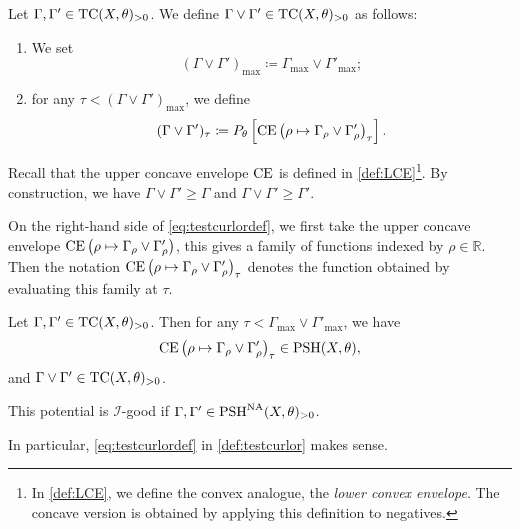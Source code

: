 \begin{definition}\label{def:testcurlor}
    Let $\Gamma,\Gamma'\in \mathrm{TC}(X,\theta)_{>0}$. We define $\Gamma\lor \Gamma'\in \mathrm{TC}(X,\theta)_{>0}$ as follows:
    \begin{enumerate}
        \item\label{itm:def:testcurlor:1} We set
        \[
            (\Gamma\lor \Gamma')_{\max}\coloneqq \Gamma_{\max}\lor \Gamma'_{\max};
        \]
        \item\label{itm:def:testcurlor:2} for any $\tau<(\Gamma\lor \Gamma')_{\max}$, we define
        \begin{equation}\label{eq:testcurlordef}
            (\Gamma\lor \Gamma')_{\tau}\coloneqq P_{\theta}\left[ \operatorname{CE}\left( \rho \mapsto \Gamma_{\rho}\lor \Gamma'_{\rho} \right)_{\tau} \right].
        \end{equation}
    \end{enumerate}
\end{definition}
Recall that the upper concave envelope $\operatorname{CE}$ is defined in \cref{def:LCE}\footnote{In \cref{def:LCE}, we define the convex analogue, the \emph{lower convex envelope}. The concave version is obtained by applying this definition to negatives.}. By construction, we have $\Gamma\lor \Gamma'\geq \Gamma$ and $\Gamma\lor \Gamma'\geq \Gamma'$.

On the right-hand side of \eqref{eq:testcurlordef}, we first take the upper concave envelope $\operatorname{CE}\left( \rho \mapsto \Gamma_{\rho}\lor \Gamma'_{\rho} \right)$, this gives a family of functions indexed by $\rho\in \mathbb{R}$. Then the notation $\operatorname{CE}\left( \rho \mapsto \Gamma_{\rho}\lor \Gamma'_{\rho} \right)_{\tau}$ denotes the function obtained by evaluating this family at $\tau$.

\begin{lemma}\label{lma:testcurlor}
    Let $\Gamma,\Gamma'\in \mathrm{TC}(X,\theta)_{>0}$. Then for any $\tau<\Gamma_{\max}\lor \Gamma'_{\max}$, we have
    \[
        \operatorname{CE}\left( \rho \mapsto \Gamma_{\rho}\lor \Gamma'_{\rho} \right)_{\tau}\in \mathrm{PSH}(X,\theta),
    \]
    and $\Gamma\lor \Gamma'\in \mathrm{TC}(X,\theta)_{>0}$.

    This potential is $\mathcal{I}$-good if $\Gamma,\Gamma'\in \mathrm{PSH}^{\mathrm{NA}}(X,\theta)_{>0}$.

    In particular, \eqref{eq:testcurlordef} in \cref{def:testcurlor} makes sense.
\end{lemma}

